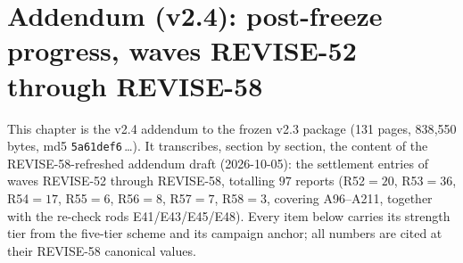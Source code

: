 \newcommand{\tierThm}{\emph{[theorem]}}
\newcommand{\tierPCand}{\emph{[paper candidate]}}
\newcommand{\tierMUCC}{\emph{[machine universal-closure candidate]}}
\newcommand{\tierMCA}{\emph{[machine-check account]}}
\newcommand{\tierProf}{\emph{[profile]}}
\newcommand{\openlab}{\emph{[open]}}
\newcommand{\stanchor}[2]{(STATE \S#1, rows~#2)}
\newcommand{\stanchorone}[2]{(STATE \S#1, row~#2)}

\section{Addendum (v2.4): post-freeze progress, waves REVISE-52 through
REVISE-58}\label{sec:addendum}

This chapter is the v2.4 addendum to the frozen v2.3 package (131 pages,
838{,}550 bytes, md5 \texttt{5a61def6}\,\dots). It transcribes, section by
section, the content of the REVISE-58-refreshed addendum draft (2026-10-05):
the settlement entries of waves REVISE-52 through REVISE-58, totalling
$97$ reports (R52$=20$, R53$=36$, R54$=17$, R55$=6$, R56$=8$, R57$=7$,
R58$=3$, covering A96--A211, together with the re-check rods E41/E43/E45/E48).
Every item below carries its strength tier from the five-tier scheme and its
campaign anchor; all numbers are cited at their REVISE-58 canonical values.

